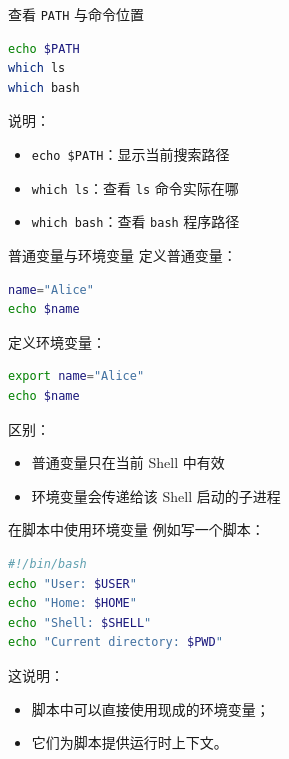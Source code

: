 \documentclass[aspectratio=169]{beamer}
\begin{document}
\begin{frame}[fragile]{查看 \texttt{PATH} 与命令位置}
\begin{lstlisting}[language=bash]
echo $PATH
which ls
which bash
\end{lstlisting}

\vspace{0.5em}
说明：
\begin{itemize}
  \item \texttt{echo \$PATH}：显示当前搜索路径
  \item \texttt{which ls}：查看 \texttt{ls} 命令实际在哪
  \item \texttt{which bash}：查看 \texttt{bash} 程序路径
\end{itemize}
\end{frame}

\begin{frame}[fragile]{普通变量与环境变量}
定义普通变量：

\begin{lstlisting}[language=bash]
name="Alice"
echo $name
\end{lstlisting}

定义环境变量：

\begin{lstlisting}[language=bash]
export name="Alice"
echo $name
\end{lstlisting}

\vspace{0.8em}
区别：
\begin{itemize}
  \item 普通变量只在当前 Shell 中有效
  \item 环境变量会传递给该 Shell 启动的子进程
\end{itemize}
\end{frame}

\begin{frame}[fragile]{在脚本中使用环境变量}
例如写一个脚本：

\begin{lstlisting}[language=bash]
#!/bin/bash
echo "User: $USER"
echo "Home: $HOME"
echo "Shell: $SHELL"
echo "Current directory: $PWD"
\end{lstlisting}

\vspace{0.8em}
这说明：
\begin{itemize}
  \item 脚本中可以直接使用现成的环境变量；
  \item 它们为脚本提供运行时上下文。
\end{itemize}
\end{frame}
\end{document}
